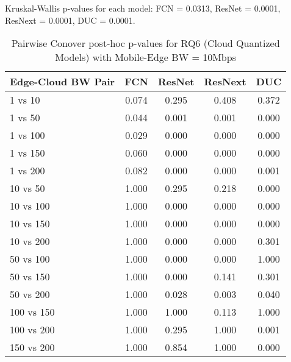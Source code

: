 \begin{table}[h]
\centering
\caption{Pairwise Conover post-hoc p-values for RQ6 (Cloud Quantized Models) with Mobile-Edge BW = 10Mbps}
\label{tab:conover_cloud_quantized_me10}
\smallskip
Kruskal-Wallis p-values for each model: FCN = 0.0313, ResNet = 0.0001, ResNext = 0.0001, DUC = 0.0001.

\begin{tabular}{lcccc}
\toprule
Edge-Cloud BW Pair & FCN & ResNet & ResNext & DUC \\
\midrule
1 vs 10 & 0.074 & 0.295 & 0.408 & 0.372 \\
1 vs 50 & 0.044 & 0.001 & 0.001 & 0.000 \\
1 vs 100 & 0.029 & 0.000 & 0.000 & 0.000 \\
1 vs 150 & 0.060 & 0.000 & 0.000 & 0.000 \\
1 vs 200 & 0.082 & 0.000 & 0.000 & 0.001 \\
10 vs 50 & 1.000 & 0.295 & 0.218 & 0.000 \\
10 vs 100 & 1.000 & 0.000 & 0.000 & 0.000 \\
10 vs 150 & 1.000 & 0.000 & 0.000 & 0.000 \\
10 vs 200 & 1.000 & 0.000 & 0.000 & 0.301 \\
50 vs 100 & 1.000 & 0.000 & 0.000 & 1.000 \\
50 vs 150 & 1.000 & 0.000 & 0.141 & 0.301 \\
50 vs 200 & 1.000 & 0.028 & 0.003 & 0.040 \\
100 vs 150 & 1.000 & 1.000 & 0.113 & 1.000 \\
100 vs 200 & 1.000 & 0.295 & 1.000 & 0.001 \\
150 vs 200 & 1.000 & 0.854 & 1.000 & 0.000 \\
\bottomrule
\end{tabular}
\end{table}


